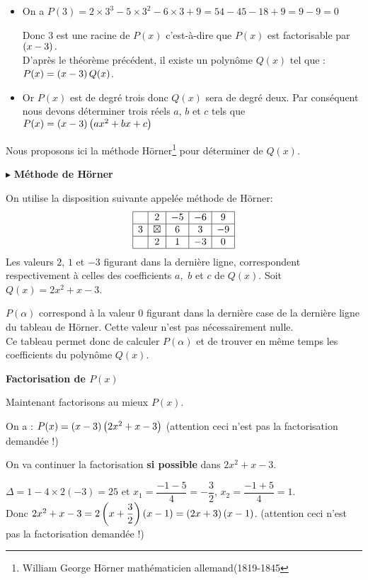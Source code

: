 \begin{itemize}
\item  On a $ P(3)=  2\times 3^{3}-5\times 3^{2}-6\times 3+9 = 54-45 -18 +9=9-9=0$

Donc 3 est une racine de $ P(x) $  c'est-à-dire que $ P(x) $  est factorisable par $ \left(x-3\right).$ \\D'après le théorème précédent, il existe un polynôme $ Q(x) $ tel que :                         $  P(x)=\left(x-3\right)Q(x) $.


 \item  Or  $ P(x) $  est de degré trois donc $ Q(x) $ sera de degré  deux. Par conséquent nous devons déterminer trois réels $ a$, $ b $  et $ c$ tels que 
$  P(x)=\left(x-3\right)\left(ax^{2} +bx +c\right) $ 
\end{itemize}
 Nous proposons ici la  méthode  Hörner\footnote{William George Hörner mathématicien allemand(1819-1845}  pour  déterminer de $ Q(x) $.
 \bigskip
 
$ \blacktriangleright $ \textbf{ Méthode de   Hörner}
 

On utilise la disposition suivante appelée méthode de Hörner:
\renewcommand{\arraystretch}{1.3}
\[\begin{array}{|c|c|c|c|c|}
\hline   & 2 & -5 &  -6 &  9  \\
\hline
3  & \boxtimes   & 6 & 3 & -9   \\
\hline
 & 2 & 1 & -3 & 0 \\
\hline
\end{array}\]
Les valeurs $ 2 $, $ 1 $ et $ -3 $ figurant dans la dernière ligne, correspondent respectivement à celles des coefficients   $a ,$ $ b $ et  $c $ de \; $ Q(x). $  Soit \; $ Q(x)=2x^{2}+x-3 $.

$ P(\alpha) $  correspond à la valeur  $ 0 $ figurant dans la dernière case de la dernière ligne du tableau de Hörner. Cette valeur n'est pas nécessairement nulle.\\ Ce tableau permet donc de calculer $ P(\alpha) $ et de trouver en même temps les coefficients du polynôme 
$ Q(x). $ 
\bigskip

\textbf{Factorisation de $ P(x) $ }

Maintenant factorisons au mieux $ P(x) $.

On a : $  P(x)=\left(x-3\right)\left(2x^{2}+x-3\right) $ \; (attention ceci n'est pas la factorisation demandée  !)

On va  continuer la factorisation  \textbf{si possible} dans\; $2x^{2}+x-3$.

$ \Delta=1-4\times2(-3)=25 $\; et $ x_{1}=\dfrac{-1-5}{4}=-\dfrac{3}{2} $,\; $ x_{2}=\dfrac{-1+5}{4}=1 $.\\Donc \;$2x^{2}+x-3=2\left(x+\dfrac{3}{2}\right)\left(x-1\right)=\left(2x+3\right)\left(x-1\right)$. \; (attention ceci n'est pas la factorisation demandée  !)\\

